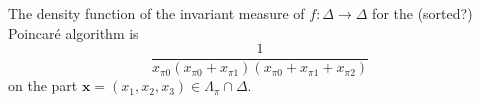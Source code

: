 The density function of the invariant measure of $f:\Delta\to\Delta$ for
the (sorted?) Poincar\'e algorithm is
\[
\frac{1}{x_{\pi 0}(x_{\pi 0}+x_{\pi 1})(x_{\pi 0}+x_{\pi 1}+x_{\pi 2})}
\]
on the part $\mathbf{x}=(x_1,x_2,x_3)\in\Lambda_\pi\cap\Delta$.
